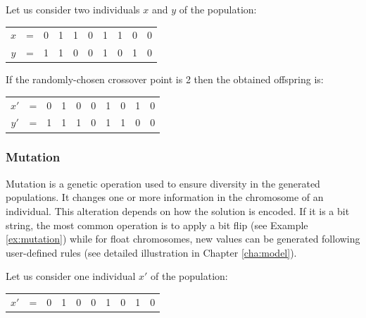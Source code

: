 \begin{example}
\label{ex:crossover}
Let us consider two individuals $x$ and $y$ of the population:
\begin{table}[h!]
\begin{center}
\begin{tabular}{cccccccccc}
$x$ & = & 0 & 1 & 1 & 0 & 1 & 1 & 0 & 0\\
$y$ & = & 1 & 1 & 0 & 0 & 1 & 0 & 1 & 0
\end{tabular}
\end{center}
\end{table}

\noindent
If the randomly-chosen crossover point is 2 then the obtained offspring is:
\begin{table}[h!]
\begin{center}
\begin{tabular}{cccc|cccccc}
$x'$ & = & 0 & 1 & 0 & 0 & 1 & 0 & 1 & 0\\
$y'$ & = & 1 & 1 & 1 & 0 & 1 & 1 & 0 & 0
\end{tabular}
\end{center}
\end{table}
\end{example}

\subsubsection{Mutation}
Mutation is a genetic operation used to ensure diversity in the generated populations. It changes one or more information in the chromosome of an individual. This alteration depends on how the solution is encoded. If it is a bit string, the most common operation is to apply a bit flip (see Example \ref{ex:mutation}) while for float chromosomes, new values can be generated following user-defined rules (see detailed illustration in Chapter \ref{cha:model}).

\begin{example}
\label{ex:mutation}
Let us consider one individual $x'$ of the population:
\begin{table}[h!]
\begin{center}
\begin{tabular}{cccccccccc}
$x'$ & = & 0 & 1 & 0 & 0 & 1 & 0 & 1 & 0\\
\end{tabular}
\end{center}
\end{table}
\end{example}

